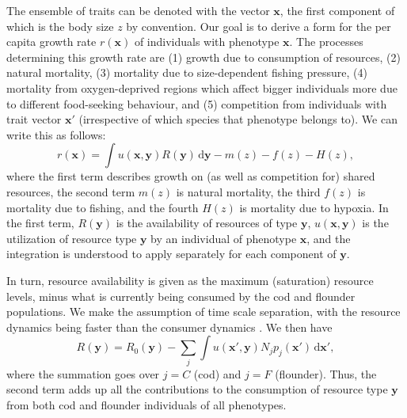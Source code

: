 \documentclass{article}
\newcommand{\mat}[1]{\bm{#1}}
\newcommand{\ud}{\text{d}}
\begin{document}
The ensemble of traits can be denoted with the vector $\mat{x}$, the first component of which is the body size $z$ by convention. Our goal is to derive a form for the per capita growth rate $r(\mat{x})$ of individuals with phenotype $\mat{x}$. The processes determining this growth rate are (1) growth due to consumption of resources, (2) natural mortality, (3) mortality due to size-dependent fishing pressure, (4) mortality from oxygen-deprived regions which affect bigger individuals more due to different food-seeking behaviour, and (5) competition from individuals with trait vector $\mat{x}'$ (irrespective of which species that phenotype belongs to). We can write this as follows:
\begin{equation}
  \label{eq-r}
  r(\mat{x})
  = \int u(\mat{x}, \mat{y}) R(\mat{y}) \,\ud\mat{y}
  - m(z)
  - f(z)
  - H(z),
\end{equation}
where the first term describes growth on (as well as competition for) shared resources, the second term $m(z)$ is natural mortality, the third $f(z)$ is mortality due to fishing, and the fourth $H(z)$ is mortality due to hypoxia. In the first term, $R(\mat{y})$ is the availability of resources of type $\mat{y}$, $u(\mat{x}, \mat{y})$ is the utilization of resource type $\mat{y}$ by an individual of phenotype $\mat{x}$, and the integration is understood to apply separately for each component of $\mat{y}$.

In turn, resource availability is given as the maximum (saturation) resource levels, minus what is currently being consumed by the cod and flounder populations. We make the assumption of time scale separation, with the resource dynamics being faster than the consumer dynamics \citep{MacArthur1970, Pastore2021, Barabasetal2022}. We then have
\begin{equation}
  \label{eq-R}
  R(\mat{y})
  = R_0(\mat{y})
  - \sum_j \int u(\mat{x}', \mat{y})
  N_j p_j(\mat{x}') \,\ud\mat{x}',
\end{equation}
where the summation goes over $j = C$ (cod) and $j = F$ (flounder). Thus, the second term adds up all the contributions to the consumption of resource type $\mat{y}$ from both cod and flounder individuals of all phenotypes.
\end{document}
